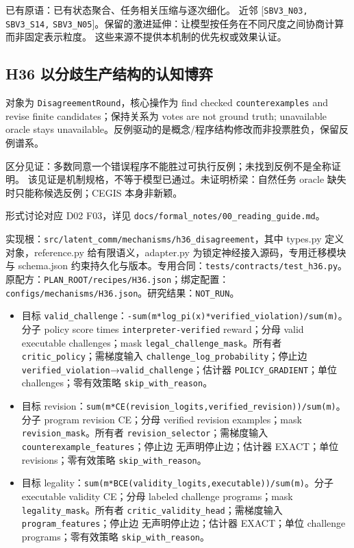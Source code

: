 \documentclass[
  10pt,
]{article}
\begin{document}
已有原语：已有状态聚合、任务相关压缩与逐次细化。 近邻
{[}\nolinkurl{SBV3_N03,} \nolinkurl{SBV3_S14,}
\nolinkurl{SBV3_N05}{]}。保留的激进延伸：让模型按任务在不同尺度之间协商计算而非固定表示粒度。
这些来源不提供本机制的优先权或效果认证。

\subsection{H36
以分歧生产结构的认知博弈}\label{h36-ux4ee5ux5206ux6b67ux751fux4ea7ux7ed3ux6784ux7684ux8ba4ux77e5ux535aux5f08}

对象为 \nolinkurl{DisagreementRound}，核心操作为 find checked
\nolinkurl{counterexamples} and revise finite candidates；保持关系为
votes are not ground truth; unavailable oracle stays
unavailable。反例驱动的是概念/程序结构修改而非投票胜负，保留反例谱系。

区分见证：多数同意一个错误程序不能胜过可执行反例；未找到反例不是全称证明。
该见证是机制规格，不等于模型已通过。未证明桥梁：自然任务 oracle
缺失时只能称候选反例；CEGIS 本身非新颖。

形式讨论对应 D02 F03，详见
{\small\nolinkurl{docs/formal_notes/00_reading_guide.md}}。

实现根：{\small\nolinkurl{src/latent_comm/mechanisms/h36_disagreement}}，其中
types.py 定义对象，reference.py 给有限语义，adapter.py
为锁定神经接入源码，专用迁移模块与 schema.json
约束持久化与版本。专用合同：{\small\nolinkurl{tests/contracts/test_h36.py}}。原配方：{\small\nolinkurl{PLAN_ROOT/recipes/H36.json}}；绑定配置：{\small\nolinkurl{configs/mechanisms/H36.json}}。研究结果：\nolinkurl{NOT_RUN}。

\begin{itemize}
\item
  目标
  \nolinkurl{valid_challenge}：{\small\nolinkurl{-sum(m*log_pi(x)*verified_violation)/sum(m)}}。分子
  policy score times \nolinkurl{interpreter-verified} reward；分母 valid
  executable challenges；mask \nolinkurl{legal_challenge_mask}。所有者
  \nolinkurl{critic_policy}；需梯度输入
  \nolinkurl{challenge_log_probability}；停止边
  \nolinkurl{verified_violation}→\nolinkurl{valid_challenge}；估计器
  \nolinkurl{POLICY_GRADIENT}；单位 challenges；零有效策略
  \nolinkurl{skip_with_reason}。
\item
  目标
  revision：{\small\nolinkurl{sum(m*CE(revision_logits,verified_revision))/sum(m)}}。分子
  program revision CE；分母 verified revision examples；mask
  \nolinkurl{revision_mask}。所有者
  \nolinkurl{revision_selector}；需梯度输入
  \nolinkurl{counterexample_features}；停止边 无声明停止边；估计器
  EXACT；单位 revisions；零有效策略 \nolinkurl{skip_with_reason}。
\item
  目标
  legality：{\small\nolinkurl{sum(m*BCE(validity_logits,executable))/sum(m)}}。分子
  executable validity CE；分母 labeled challenge programs；mask
  \nolinkurl{legality_mask}。所有者
  \nolinkurl{critic_validity_head}；需梯度输入
  \nolinkurl{program_features}；停止边 无声明停止边；估计器 EXACT；单位
  challenge programs；零有效策略 \nolinkurl{skip_with_reason}。
\end{itemize}
\end{document}
